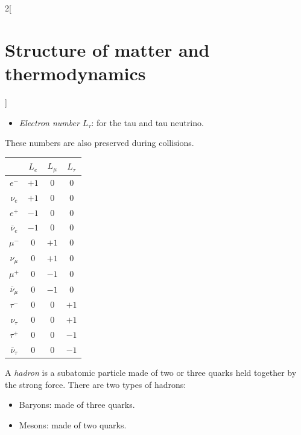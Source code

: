 \documentclass[../../../main.tex]{subfiles}
\begin{document}
\begin{multicols}{2}[\section{Structure of matter and thermodynamics}]
\begin{definition}
\begin{itemize}
      \item \textit{Electron number $L_\tau$}: for the tau and tau neutrino.
    \end{itemize}
    These numbers are also preserved during collisions.
    \begin{center}
      \begin{minipage}{\linewidth}
        \centering
        \begin{tabular}{cccc}
                           & $L_e$ & $L_\mu$ & $L_\tau$ \\
          \hline
          $e^-$            & $+1$  & 0       & 0        \\
          $\nu_e$          & $+1$  & 0       & 0        \\
          $e^+$            & $-1$  & 0       & 0        \\
          $\bar{\nu}_e$    & $-1$  & 0       & 0        \\
          $\mu^-$          & 0     & $+1$    & 0        \\
          $\nu_\mu$        & 0     & $+1$    & 0        \\
          $\mu^+$          & 0     & $-1$    & 0        \\
          $\bar{\nu}_\mu$  & 0     & $-1$    & 0        \\
          $\tau^-$         & 0     & 0       & $+1$     \\
          $\nu_\tau$       & 0     & 0       & $+1$     \\
          $\tau^+$         & 0     & 0       & $-1$     \\
          $\bar{\nu}_\tau$ & 0     & 0       & $-1$     \\
        \end{tabular}
      \end{minipage}
    \end{center}
  \end{definition}
  \begin{definition}[Hadron]
    A \textit{hadron} is a subatomic particle made of two or three quarks held together by the strong force. There are two types of hadrons:
    \begin{itemize}
      \item Baryons: made of three quarks.
      \item Mesons: made of two quarks.
    \end{itemize}
  \end{definition}
  \begin{definition}\label{SMT_color}

\end{definition}
\end{multicols}
\end{document}
